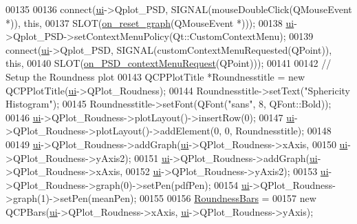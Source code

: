 \begin{DoxyCode}
{00135 
00136   connect(\hyperlink{class_v_s_a_main_window_a958a0581d2bf1bfe020c3b5d8f738640}{ui}->Qplot\_PSD, SIGNAL(mouseDoubleClick(QMouseEvent *)), \textcolor{keyword}{this},
00137           SLOT(\hyperlink{class_v_s_a_main_window_ad7658d814c3f41b673ba3d888ef68b00}{on\_reset\_graph}(QMouseEvent *)));
00138   \hyperlink{class_v_s_a_main_window_a958a0581d2bf1bfe020c3b5d8f738640}{ui}->Qplot\_PSD->setContextMenuPolicy(Qt::CustomContextMenu);
00139   connect(\hyperlink{class_v_s_a_main_window_a958a0581d2bf1bfe020c3b5d8f738640}{ui}->Qplot\_PSD, SIGNAL(customContextMenuRequested(QPoint)), \textcolor{keyword}{this},
00140           SLOT(\hyperlink{class_v_s_a_main_window_a8d9025970a6a3b27c1f83a92df6c1bad}{on\_PSD\_contextMenuRequest}(QPoint)));
00141 
00142   \textcolor{comment}{// Setup the Roundness plot}
00143   QCPPlotTitle *Roundnesstitle = \textcolor{keyword}{new} QCPPlotTitle(\hyperlink{class_v_s_a_main_window_a958a0581d2bf1bfe020c3b5d8f738640}{ui}->QPlot\_Roudness);
00144   Roundnesstitle->setText(\textcolor{stringliteral}{"Sphericity Histogram"});
00145   Roundnesstitle->setFont(QFont(\textcolor{stringliteral}{"sans"}, 8, QFont::Bold));
00146   \hyperlink{class_v_s_a_main_window_a958a0581d2bf1bfe020c3b5d8f738640}{ui}->QPlot\_Roudness->plotLayout()->insertRow(0);
00147   \hyperlink{class_v_s_a_main_window_a958a0581d2bf1bfe020c3b5d8f738640}{ui}->QPlot\_Roudness->plotLayout()->addElement(0, 0, Roundnesstitle);
00148 
00149   \hyperlink{class_v_s_a_main_window_a958a0581d2bf1bfe020c3b5d8f738640}{ui}->QPlot\_Roudness->addGraph(\hyperlink{class_v_s_a_main_window_a958a0581d2bf1bfe020c3b5d8f738640}{ui}->QPlot\_Roudness->xAxis,
00150                                \hyperlink{class_v_s_a_main_window_a958a0581d2bf1bfe020c3b5d8f738640}{ui}->QPlot\_Roudness->yAxis2);
00151   \hyperlink{class_v_s_a_main_window_a958a0581d2bf1bfe020c3b5d8f738640}{ui}->QPlot\_Roudness->addGraph(\hyperlink{class_v_s_a_main_window_a958a0581d2bf1bfe020c3b5d8f738640}{ui}->QPlot\_Roudness->xAxis,
00152                                \hyperlink{class_v_s_a_main_window_a958a0581d2bf1bfe020c3b5d8f738640}{ui}->QPlot\_Roudness->yAxis2);
00153   \hyperlink{class_v_s_a_main_window_a958a0581d2bf1bfe020c3b5d8f738640}{ui}->QPlot\_Roudness->graph(0)->setPen(pdfPen);
00154   \hyperlink{class_v_s_a_main_window_a958a0581d2bf1bfe020c3b5d8f738640}{ui}->QPlot\_Roudness->graph(1)->setPen(meanPen);
00155 
00156   \hyperlink{class_v_s_a_main_window_afe7a5404f6f35af0c40eb277d91b82ac}{RoundnessBars} =
00157       \textcolor{keyword}{new} QCPBars(\hyperlink{class_v_s_a_main_window_a958a0581d2bf1bfe020c3b5d8f738640}{ui}->QPlot\_Roudness->xAxis, \hyperlink{class_v_s_a_main_window_a958a0581d2bf1bfe020c3b5d8f738640}{ui}->QPlot\_Roudness->yAxis);
}
\end{DoxyCode}
